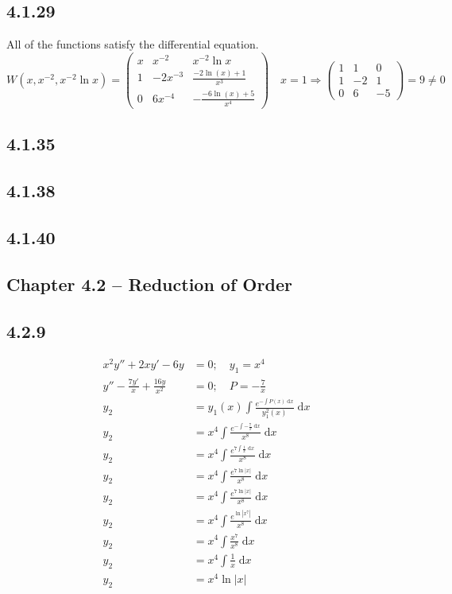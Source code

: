 \documentclass{article}
\begin{document}
\subsection{4.1.29}
All of the functions satisfy the differential equation.
\[
    W(x,x^{-2},x^{-2}\ln x)=\begin{pmatrix}x&x^{-2}&x^{-2}\ln x\\1&-2x^{-3}&\frac{-2 \ln (x) +1}{x^3}\\0 & 6x^{-4} & -\frac{-6 \ln (x)+5}{x^4}\end{pmatrix} \quad x=1 \Rightarrow \begin{pmatrix}1&1&0\\1&-2&1\\0 & 6 & -5\end{pmatrix}=9 \neq 0
\]

\subsection{4.1.35}
\subsection{4.1.38}
\subsection{4.1.40}

    
\subsection{Chapter 4.2 -- Reduction of Order}

\subsection{4.2.9}
\begin{align*}
    x^2y''+2xy'-6y &= 0; \quad y_1 = x^4\\
    y''-\frac{7y'}{x}+\frac{16y}{x^2}  &= 0; \quad P = -\frac{7}{x}  \\
    y_2 &= y_1(x) \int \frac{e^{-\int P(x) \; \mathrm{d}x}}{y_1^2(x)} \; \mathrm{d}x\\
    y_2 &= x^4 \int \frac{e^{-\int -\frac{7}{x} \; \mathrm{d}x}}{x^8} \; \mathrm{d}x\\
    y_2 &= x^4 \int \frac{e^{7\int \frac{1}{x} \; \mathrm{d}x}}{x^8} \; \mathrm{d}x\\
    y_2 &= x^4 \int \frac{e^{7 \ln\left|x\right|}}{x^8} \; \mathrm{d}x\\
    y_2 &= x^4 \int \frac{e^{7 \ln\left|x\right|}}{x^8} \; \mathrm{d}x\\
    y_2 &= x^4 \int \frac{e^{ \ln\left|x^7\right|}}{x^8} \; \mathrm{d}x\\
    y_2 &= x^4 \int \frac{x^7}{x^8} \; \mathrm{d}x\\
    y_2 &= x^4 \int \frac{1}{x} \; \mathrm{d}x\\
    y_2 &= x^4 \ln\left|x\right|
\end{align*}
\end{document}
